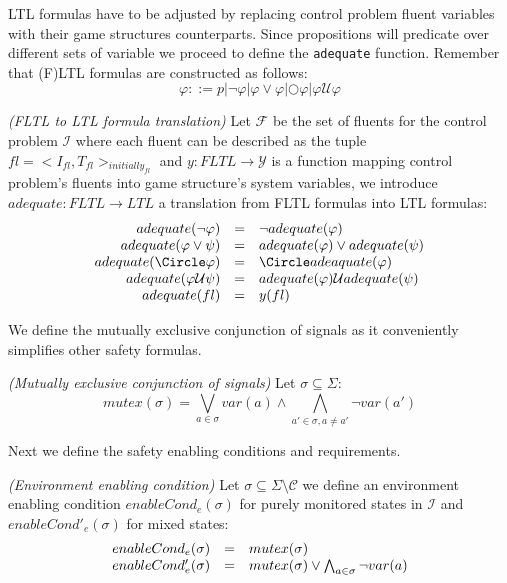 LTL formulas have to be adjusted by replacing control
problem fluent variables with their game structures counterparts.
Since propositions will predicate over different sets of variable
we proceed to define the \texttt{adequate} function.
Remember that (F)LTL formulas are constructed as follows:
\[\varphi ::= p | \neg \varphi | \varphi \vee \varphi | \Circle \varphi | \varphi \mathcal{U} \varphi\]
\begin{definition}\label{def:ltl-adequate}\emph{(FLTL to LTL formula translation)}
Let $\mathcal{F}$ be the set of fluents for the control problem 
$\mathcal{I}$ where each fluent can be described as the tuple
$fl = <I_{fl}, T_{fl}>_{initially_{fl}}$ and 
$y:FLTL \rightarrow \mathcal{Y}$ is a function mapping
control problem's fluents into game structure's system variables,
we introduce  $adequate:FLTL \rightarrow LTL$ a
translation from FLTL formulas into LTL formulas:
\[
\begin{array}{r c l}
adequate(\neg \varphi) &=& \neg adequate(\varphi)\\
adequate(\varphi \vee \psi) &=& adequate(\varphi) \vee adequate(\psi)\\
adequate(\Circle \varphi) &=& \Circle adeaquate(\varphi)\\
adequate(\varphi \mathcal{U} \psi) &=& adequate(\varphi) \mathcal{U} adequate(\psi)\\
adequate(fl) &=& y(fl)\\
\end{array}
\]
\end{definition}

We define the mutually exclusive conjunction of signals
as it conveniently simplifies other safety formulas.

\begin{definition}\label{def:mutex-signal}\emph{(Mutually exclusive conjunction of signals)}
Let $\sigma \subseteq \Sigma$:
\[mutex(\sigma) = \bigvee_{a \in \sigma} var(a) \wedge \bigwedge_{a' \in \sigma, a \neq a'} \neg var(a')\]
\end{definition}

Next we define the safety enabling conditions and requirements.

\begin{definition}\label{def:env-enabling-condition}\emph{(Environment enabling condition)}
Let $\sigma \subseteq \Sigma \setminus \mathcal{C}$ we define an environment enabling condition $enableCond_e(\sigma)$ for purely monitored states in $\mathcal{I}$ and 
$enableCond'_e(\sigma)$ for mixed states:
\[
\begin{array}{r c l}
enableCond_e(\sigma) &=& mutex(\sigma)\\
enableCond'_e(\sigma) &=& mutex(\sigma) \vee \bigwedge_{a \in \sigma} \neg var(a)\\
\end{array}
\]
\end{definition}


